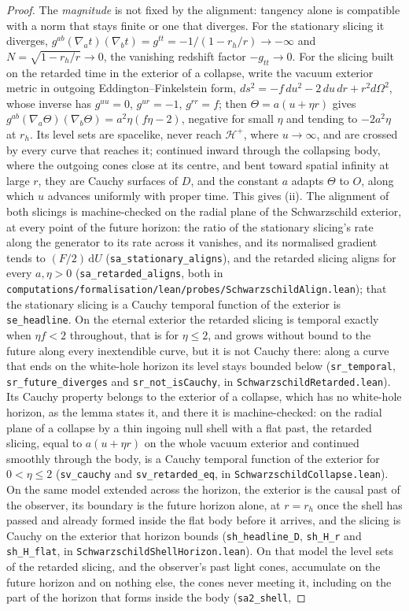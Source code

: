 \documentclass[11pt,a4paper]{article}
\theoremstyle{plain}
\theoremstyle{remark}
\begin{document}
\begin{proof}
The \emph{magnitude} is not fixed by the alignment: tangency alone is compatible with a norm that stays finite or one that diverges. For the stationary slicing it diverges, $g^{ab}(\nabla_a t)(\nabla_b t)=g^{tt}=-1/(1-r_h/r)\to-\infty$ and $N=\sqrt{1-r_h/r}\to 0$, the vanishing redshift factor $-g_{tt}\to0$. For the slicing built on the retarded time in the exterior of a collapse, write the vacuum exterior metric in outgoing Eddington--Finkelstein form, $ds^{2}=-f\,du^{2}-2\,du\,dr+r^{2}d\Omega^{2}$, whose inverse has $g^{uu}=0$, $g^{ur}=-1$, $g^{rr}=f$; then $\Theta=a(u+\eta r)$ gives $g^{ab}(\nabla_a\Theta)(\nabla_b\Theta)=a^{2}\eta(f\eta-2)$, negative for small $\eta$ and tending to $-2a^{2}\eta$ at $r_h$. Its level sets are spacelike, never reach $\mathcal{H}^+$, where $u\to\infty$, and are crossed by every curve that reaches it; continued inward through the collapsing body, where the outgoing cones close at its centre, and bent toward spatial infinity at large $r$, they are Cauchy surfaces of $D$, and the constant $a$ adapts $\Theta$ to $O$, along which $u$ advances uniformly with proper time. This gives (ii). The alignment of both slicings is machine-checked on the radial plane of the Schwarzschild exterior, at every point of the future horizon: the ratio of the stationary slicing's rate along the generator to its rate across it vanishes, and its normalised gradient tends to $(F/2)\,\mathrm{d}U$ (\texttt{sa\_stationary\_aligns}), and the retarded slicing aligns for every $a,\eta>0$ (\texttt{sa\_retarded\_aligns}, both in \texttt{computations/formalisation/lean/probes/SchwarzschildAlign.lean}); that the stationary slicing is a Cauchy temporal function of the exterior is \texttt{se\_headline}. On the eternal exterior the retarded slicing is temporal exactly when $\eta f<2$ throughout, that is for $\eta\le2$, and grows without bound to the future along every inextendible curve, but it is not Cauchy there: along a curve that ends on the white-hole horizon its level stays bounded below (\texttt{sr\_temporal}, \texttt{sr\_future\_diverges} and \texttt{sr\_not\_isCauchy}, in \texttt{SchwarzschildRetarded.lean}). Its Cauchy property belongs to the exterior of a collapse, which has no white-hole horizon, as the lemma states it, and there it is machine-checked: on the radial plane of a collapse by a thin ingoing null shell with a flat past, the retarded slicing, equal to $a(u+\eta r)$ on the whole vacuum exterior and continued smoothly through the body, is a Cauchy temporal function of the exterior for $0<\eta\le2$ (\texttt{sv\_cauchy} and \texttt{sv\_retarded\_eq}, in \texttt{SchwarzschildCollapse.lean}). On the same model extended across the horizon, the exterior is the causal past of the observer, its boundary is the future horizon alone, at $r=r_h$ once the shell has passed and already formed inside the flat body before it arrives, and the slicing is Cauchy on the exterior that horizon bounds (\texttt{sh\_headline\_D}, \texttt{sh\_H\_r} and \texttt{sh\_H\_flat}, in \texttt{SchwarzschildShellHorizon.lean}). On that model the level sets of the retarded slicing, and the observer's past light cones, accumulate on the future horizon and on nothing else, the cones never meeting it, including on the part of the horizon that forms inside the body (\texttt{sa2\_shell}, 
\end{proof}
\end{document}
